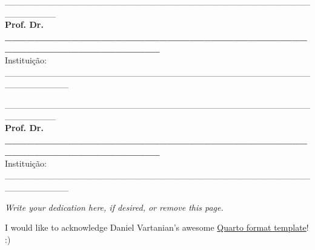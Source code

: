 \begin{folhadeaprovacao}
\begin{center}
\vspace*{2cm}

\_\_\_\_\_\_\_\_\_\_\_\_\_\_\_\_\_\_\_\_\_\_\_\_\_\_\_\_\_\_\_\_\_\_\_\_\_\_\_\_\_\_\_\_\_\_\_\_\_\_\_\_\_\_\_\_
\vspace*{0.2cm}
\\ \textbf{Prof. Dr. \_\_\_\_\_\_\_\_\_\_\_\_\_\_\_\_\_\_\_\_\_\_\_\_\_\_\_\_\_\_\_\_\_\_\_\_\_\_\_\_\_\_\_\_\_\_\_\_\_\_\_\_\_\_\_\_\_\_\_\_\_\_}
\\ \vspace*{0.2cm}
Instituição: \_\_\_\_\_\_\_\_\_\_\_\_\_\_\_\_\_\_\_\_\_\_\_\_\_\_\_\_\_\_\_\_\_\_\_\_\_\_\_\_\_\_\_\_\_\_\_\_\_\_\_\_\_\_\_\_\_\_

\vspace*{2cm}

\_\_\_\_\_\_\_\_\_\_\_\_\_\_\_\_\_\_\_\_\_\_\_\_\_\_\_\_\_\_\_\_\_\_\_\_\_\_\_\_\_\_\_\_\_\_\_\_\_\_\_\_\_\_\_\_
\vspace*{0.2cm}
\\ \textbf{Prof. Dr. \_\_\_\_\_\_\_\_\_\_\_\_\_\_\_\_\_\_\_\_\_\_\_\_\_\_\_\_\_\_\_\_\_\_\_\_\_\_\_\_\_\_\_\_\_\_\_\_\_\_\_\_\_\_\_\_\_\_\_\_\_\_}
\\ \vspace*{0.2cm}
Instituição: \_\_\_\_\_\_\_\_\_\_\_\_\_\_\_\_\_\_\_\_\_\_\_\_\_\_\_\_\_\_\_\_\_\_\_\_\_\_\_\_\_\_\_\_\_\_\_\_\_\_\_\_\_\_\_\_\_\_

\end{center}
\end{folhadeaprovacao}


\begin{dedicatoria}
  \vspace*{\fill}
  \centering
  \noindent
  \textit{
    Write your dedication here, if desired, or remove this page.
  }
	\vspace*{\fill}
\end{dedicatoria}


\begin{agradecimentos}
  I would like to acknowledge Daniel Vartanian's awesome \href{https://github.com/danielvartan/tesesusp}{Quarto format template}! :)
\end{agradecimentos}

